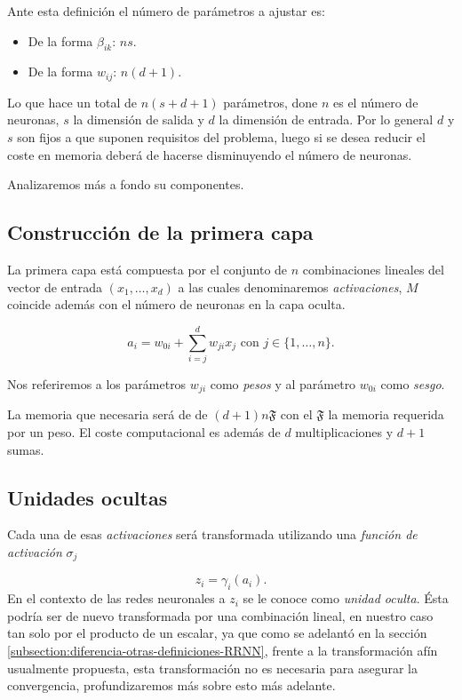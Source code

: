 Ante esta definición el número de parámetros a ajustar es: 
\begin{itemize}
    \item De la forma $\beta_{i k}$: $n s$. 
    \item De la forma $w_{i j}$: $n(d+1)$.
\end{itemize}
Lo que hace un total de $n(s+d+1)$ parámetros, done $n$ es el número de neuronas, $s$ la dimensión de salida y $d$ la dimensión de entrada. Por lo general $d$ y $s$ son fijos a que suponen requisitos del problema, luego si se desea reducir el coste en memoria deberá de hacerse disminuyendo el número de neuronas.

Analizaremos más a fondo su componentes. 

\subsection*{Construcción de la primera capa}
La primera capa está compuesta por el conjunto de $n$ combinaciones
lineales del vector de entrada $(x_1, \ldots, x_d)$
a las cuales denominaremos \textit{activaciones}, $M$ coincide además
con el número de neuronas en la capa oculta. 

\begin{equation}
    a_i = w_{0 i} + \sum_{i=j}^d w_{j i} x_j 
    \text{ con } j \in \{1, \ldots, n \}.
\end{equation}

Nos referiremos a los  parámetros $w_{j i}$ como 
\textit{pesos} y al parámetro $w_{0 i}$ como 
\textit{sesgo}.  

La memoria que necesaria será de de $(d+1)n \mathfrak{F}$ 
con el $\mathfrak{F}$ la memoria requerida por un peso. 
El coste computacional es además de $d$ multiplicaciones 
y $d+1$ sumas.

\subsection*{Unidades ocultas}
Cada una de esas \textit{activaciones} será transformada
utilizando una \textit{función de activación} $\sigma_j$ 

\begin{equation}
    z_i = \gamma_i(a_i).
\end{equation}
En el contexto de las redes neuronales a $z_i$ se le conoce como \textit{unidad oculta}. Ésta  podría ser de 
nuevo  transformada por una combinación lineal, en nuestro caso tan solo 
por el producto de un escalar, ya que como se adelantó en la sección \ref{subsection:diferencia-otras-definiciones-RRNN},
 frente a la transformación afín usualmente propuesta, esta transformación no es necesaria para asegurar la convergencia, profundizaremos más sobre esto más adelante. 

